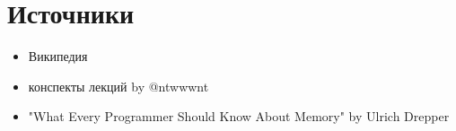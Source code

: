 \documentclass[12pt, a4paper]{article}
\begin{document}
\section{Источники}
\begin{itemize}
    \item Википедия
    \item конспекты лекций by @ntwwwnt
    \item "What Every Programmer Should Know About Memory" by Ulrich Drepper
\end{itemize}
\end{document}
